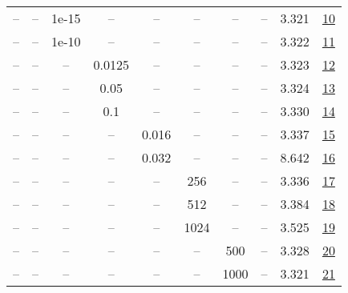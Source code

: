 \begin{table}[H]
\begin{tabular}{cccccccccc}
-- & -- & 1e-15 & -- & -- & -- & -- & -- & 3.321 & \href{https://wandb.ai/stanford-mercury/optimizer-scaling/runs/sweep-130m-10B-mars320502lr0.008-wd0.1-minlr0-warmup2000-b10.9-b-52c30e}{10} \\
-- & -- & 1e-10 & -- & -- & -- & -- & -- & 3.322 & \href{https://wandb.ai/stanford-mercury/optimizer-scaling/runs/sweep-130m-10B-mars330c3flr0.008-wd0.1-minlr0-warmup2000-b10.9-b-1789fc}{11} \\
-- & -- & -- & 0.0125 & -- & -- & -- & -- & 3.323 & \href{https://wandb.ai/stanford-mercury/optimizer-scaling/runs/sweep-130m-10B-marsdd8631lr0.008-wd0.1-minlr0-warmup2000-b10.9-b-569c37}{12} \\
-- & -- & -- & 0.05 & -- & -- & -- & -- & 3.324 & \href{https://wandb.ai/stanford-mercury/optimizer-scaling/runs/sweep-130m-10B-marsec6a72lr0.008-wd0.1-minlr0-warmup2000-b10.9-b-170a20}{13} \\
-- & -- & -- & 0.1 & -- & -- & -- & -- & 3.330 & \href{https://wandb.ai/stanford-mercury/optimizer-scaling/runs/sweep-130m-10B-mars9f1631lr0.008-wd0.1-minlr0-warmup2000-b10.9-b-a3be4e}{14} \\
-- & -- & -- & -- & 0.016 & -- & -- & -- & 3.337 & \href{https://wandb.ai/stanford-mercury/optimizer-scaling/runs/sweep-130m-10B-marsa22b0blr0.016-wd0.1-minlr0-warmup2000-b10.9-b-5f5677}{15} \\
-- & -- & -- & -- & 0.032 & -- & -- & -- & 8.642 & \href{https://wandb.ai/stanford-mercury/optimizer-scaling/runs/sweep-130m-10B-marse7bb5elr0.032-wd0.1-minlr0-warmup2000-b10.9-b-5dc390}{16} \\
-- & -- & -- & -- & -- & 256 & -- & -- & 3.336 & \href{https://wandb.ai/stanford-mercury/optimizer-scaling/runs/sweep-130m-10B-mars3389a5lr0.008-wd0.1-minlr0-warmup2000-b10.9-b-27c86b}{17} \\
-- & -- & -- & -- & -- & 512 & -- & -- & 3.384 & \href{https://wandb.ai/stanford-mercury/optimizer-scaling/runs/sweep-130m-10B-marsafd3efclr0.008-wd0.1-minlr0-warmup2000-b10.9--f46415}{18} \\
-- & -- & -- & -- & -- & 1024 & -- & -- & 3.525 & \href{https://wandb.ai/stanford-mercury/optimizer-scaling/runs/sweep-130m-10B-mars1129d3lr0.008-wd0.1-minlr0-warmup2000-b10.9-b-b11208}{19} \\
-- & -- & -- & -- & -- & -- & 500 & -- & 3.328 & \href{https://wandb.ai/stanford-mercury/optimizer-scaling/runs/sweep-130m-10B-mars342f3elr0.008-wd0.1-minlr0-warmup500-b10.9-b2-6f0cc9}{20} \\
-- & -- & -- & -- & -- & -- & 1000 & -- & 3.321 & \href{https://wandb.ai/stanford-mercury/optimizer-scaling/runs/sweep-130m-10B-mars6550falr0.008-wd0.1-minlr0-warmup1000-b10.9-b-c87967}{21} \\

\end{tabular}
\end{table}
